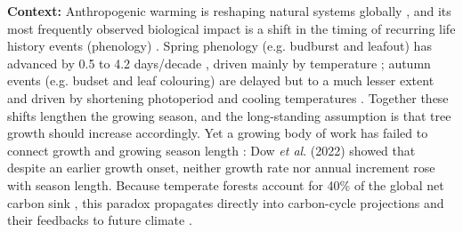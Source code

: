 \documentclass[12pt]{article}
\begin{document}
\textbf{Context:} Anthropogenic warming is reshaping natural systems globally \cite{parmesan_poleward_1999,rosenzweig_attributing_2008}, and its most frequently observed biological impact is a shift in the timing of recurring life history events (phenology) \cite{parmesan_globally_2003,cleland_shifting_2007,lieth_phenology_1974,woolway_phenological_2021,menzel_european_2006}. Spring phenology (e.g. budburst and leafout) has advanced by 0.5 \cite{wolfe_climate_2005} to 4.2 days/decade \cite{chmielewski_response_2001,fu_recent_2014}, driven mainly by temperature \cite{chuine_why_2010,cleland_shifting_2007,penuelas_responses_2001}; autumn events (e.g. budset and leaf colouring) are delayed but to a much lesser extent \cite{gallinat_autumn_2015,jeong_macroscale_2014} and driven by shortening photoperiod \cite{cooke_dynamic_2012,flynn_temperature_2018,korner_phenology_2010} and cooling temperatures \cite{cooke_dynamic_2012,delpierre_temperate_2016}. Together these shifts lengthen the growing season, and the long-standing assumption is that tree growth should increase accordingly. Yet a growing body of work has failed to connect growth and growing season length \cite{dow_warm_2022,silvestro_longer_2023,matula_shifts_2023,charletdesauvage_temperature_2022,cabon_crossbiome_2022}: Dow \textit{et al}. (2022) showed that despite an earlier growth onset, neither growth rate nor annual increment rose with season length. Because temperate forests account for 40\% of the global net carbon sink \cite{gibbs_revised_2025}, this paradox propagates directly into carbon-cycle projections and their feedbacks to future climate \cite{richardson_climate_2013,swidrak_comparing_2013}.
\end{document}

